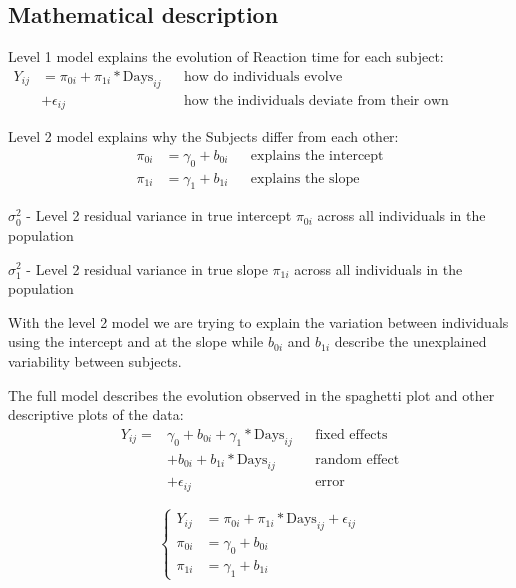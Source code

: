 \documentclass[
]{article}
\begin{document}
\hypertarget{mathematical-description}{%
\subsection{Mathematical description}\label{mathematical-description}}

Level 1 model explains the evolution of Reaction time for each subject:
\[\begin{aligned}
Y_{ij}&= \pi_{0i} + \pi_{1i}* \text{Days}_{ij} && \text{how do individuals evolve} \\
          &+ \epsilon_{ij} &&\text{how the individuals deviate from their own evolution}
\end{aligned} \tag{2}\]

Level 2 model explains why the Subjects differ from each other:
\[\begin{aligned}
\pi_{0i} &= \gamma_{0} + b_{0i} && \text{explains the intercept} \\
\pi_{1i} &= \gamma_{1} + b_{1i} && \text{explains the slope}
\end{aligned} \tag{3}\]

\(\sigma_{0}^{2}\) - Level 2 residual variance in true intercept
\(\pi_{0i}\) across all individuals in the population

\(\sigma_{1}^{2}\) - Level 2 residual variance in true slope
\(\pi_{1i}\) across all individuals in the population

With the level 2 model we are trying to explain the variation between
individuals using the intercept and at the slope while \(b_{0i}\) and
\(b_{1i}\) describe the unexplained variability between subjects.

The full model describes the evolution observed in the spaghetti plot
and other descriptive plots of the data: \[\begin{aligned}
Y_{ij} =& \gamma_{0} + b_{0i} + \gamma_{1}* \text{Days}_{ij} &&\text{fixed effects}\\
          &+ b_{0i} + b_{1i}*\text{Days}_{ij} &&\text{random effect}\\
          &+ \epsilon_{ij} &&\text{error}
\end{aligned} \tag{4}\]

\[
\begin{cases}
Y_{ij} &= \pi_{0i} + \pi_{1i}* \text{Days}_{ij} + \epsilon_{ij} \\
\pi_{0i} &= \gamma_{0} + b_{0i}  \\
\pi_{1i} &= \gamma_{1} + b_{1i}
\end{cases} \tag{5}
\]
\end{document}
